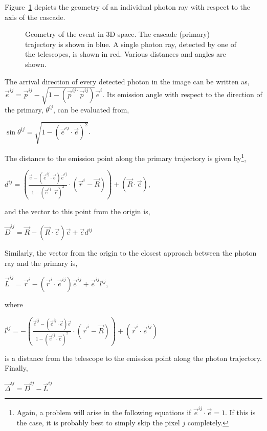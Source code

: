 \documentclass[letterpaper]{article}
\begin{document}
Figure~\ref{Fig::Geometry} depicts the geometry of an individual
photon ray with respect to the axis of the cascade.

\begin{figure}[p]
\centerline{}
\caption{\label{Fig::Geometry} Geometry of the event in 3D space. The cascade 
(primary) trajectory is shown in blue. A single photon ray, detected
by one of the telescopes, is shown in red. Various distances and
angles are shown.}
\end{figure}

The arrival direction of every detected photon in the image can be
written as, $\vec{e}^{ij}=\vec{p}^{ij} -\sqrt{1-(\vec{p}^{ij\cdot
}\vec{p}^{ij})}\vec{e}^{i}$. Its emission angle with respect to the
direction of the primary, $\theta ^{ij}$, can be evaluated from,

$\displaystyle 
\sin\theta^{ij}=\sqrt{1-\left(\vec{e}^{ij}\cdot\vec{e}\right)^{2}}$.

The distance to the emission point along the primary trajectory is
given by\footnote{Again, a problem will arise in the following
equations if $\vec{e}^{ij}\cdot\vec{e}=1$. If this is the case, it is
probably best to simply skip the pixel $j$ completely.},

$\displaystyle d^{ij}=
\left(\frac{\vec{e}-\left(\vec{e}^{ij}\cdot\vec{e}\right)
\vec{e}^{ij}}{1-\left(\vec{e}^{ij}\cdot\vec{e}\right)^{2}}
\cdot\left(\vec{r}^{i}-\vec{R}\right)\right)
+\left(\vec{R}\cdot\vec{e}\right)$,

and the vector to this point from the origin is,

$\displaystyle \vec{D}^{ij}
=\vec{R}-\left(\vec{R}\cdot\vec{e}\right)\vec{e}+\vec{e}d^{ij}$

Similarly, the vector from the origin to the closest approach between
the photon ray and the primary is,

$\displaystyle \vec{L}^{ij}=\vec{r}^{i}
-\left(\vec{r}^{i}\cdot\vec{e}^{ij}\right)\vec{e}^{ij}+\vec{e}^{ij}l^{ij}$,

where

$\displaystyle l^{ij}=-\left(\frac{\vec{e}^{ij}-\left(\vec{e}^{ij}\cdot\vec{e}
\right)\vec{e}}{1-\left(\vec{e}^{ij}\cdot\vec{e}\right)^{2}}\cdot\left(
\vec{r}^{i}-\vec{R}\right)\right)+\left(\vec{r}^{i}\cdot\vec{e}^{ij}\right)$

is a distance from the telescope to the emission point along the
photon trajectory. Finally,

$\displaystyle \vec{\Delta}^{ij}=\vec{D}^{ij}-\vec{L}^{ij}$
\end{document}
